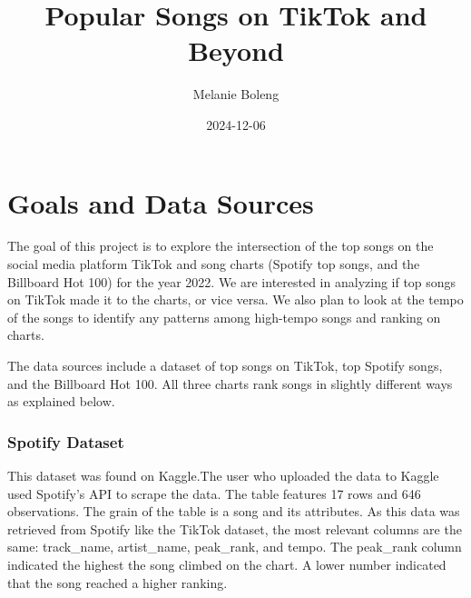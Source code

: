 \documentclass[
  letterpaper,
  DIV=11,
  numbers=noendperiod]{scrreprt}
\title{Popular Songs on TikTok and Beyond}
\author{Melanie Boleng}
\date{2024-12-06}
\renewcommand*\contentsname{Table of contents}
\newcommand\contentsname{Table of contents}
\begin{document}
\maketitle

\renewcommand*\contentsname{Table of contents}
{
\hypersetup{linkcolor=}
\setcounter{tocdepth}{2}
\tableofcontents
}


\chapter*{Goals and Data Sources}\label{goals-and-data-sources}


The goal of this project is to explore the intersection of the top songs
on the social media platform TikTok and song charts (Spotify top songs,
and the Billboard Hot 100) for the year 2022. We are interested in
analyzing if top songs on TikTok made it to the charts, or vice versa.
We also plan to look at the tempo of the songs to identify any patterns
among high-tempo songs and ranking on charts.

The data sources include a dataset of top songs on TikTok, top Spotify
songs, and the Billboard Hot 100. All three charts rank songs in
slightly different ways as explained below.

\subsection{Spotify Dataset}

This dataset was found on Kaggle.The user who uploaded the data to
Kaggle used Spotify's API to scrape the data. The table features 17 rows
and 646 observations. The grain of the table is a song and its
attributes. As this data was retrieved from Spotify like the TikTok
dataset, the most relevant columns are the same: track\_name,
artist\_name, peak\_rank, and tempo. The peak\_rank column indicated the
highest the song climbed on the chart. A lower number indicated that the
song reached a higher ranking.
\end{document}
